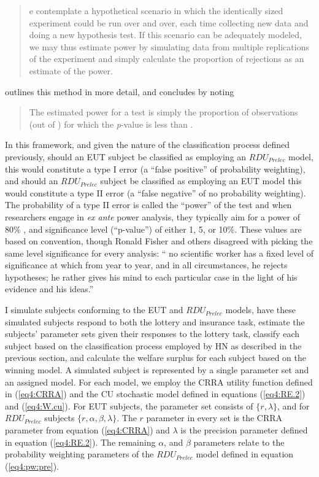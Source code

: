 \documentclass[../main.tex]{subfiles}
\begin{document}
\blockquote{
e contemplate a hypothetical scenario in which the identically sized experiment could be run over and over, each time collecting new data and doing a new hypothesis test. 
If this scenario can be adequately modeled, we may thus estimate power by simulating data from multiple replications of the experiment and simply calculate the proportion of rejections  as an estimate of the power.
}

\textcite[109]{Feiveson2002} outlines this method in more detail, and concludes by noting 
\blockquote{
	The estimated power for a  test is simply the proportion of observations (out of ) for which the \textit{p}-value is less than .
}

In this framework, and given the nature of the classification process defined previously, should an EUT subject be classified as employing an $\mathit{RDU_{Prelec}}$ model, this would constitute a type I error (a \enquote{false positive} of probability weighting), and should an $\mathit{RDU_{Prelec}}$ subject be classified as employing an EUT model this would constitute a type II error (a \enquote{false negative} of no probability weighting).
The probability of a type II error is called the \enquote{power} of the test and when researchers engage in \textit{ex ante} power analysis, they typically aim for a power of 80\% \parencite{Cohen1988, Gelman2014}, and significance level (\enquote{p-value}) of either 1, 5, or 10\%.
These values are based on convention, though Ronald Fisher and others disagreed with picking the same level significance for every analysis: \enquote{\textelp{} no scientific worker has a fixed level of significance at which from year to year, and in all circumstances, he rejects hypotheses; he rather gives his mind to each particular case in the light of his evidence and his ideas.} \parencite{Fisher1956}

I simulate subjects conforming to the EUT and $\mathit{RDU_{Prelec}}$ models, have these simulated subjects respond to both the lottery and insurance task, estimate the subjects' parameter sets given their responses to the lottery task, classify each subject based on the classification process employed by HN as described in the previous section, and calculate the welfare surplus for each subject based on the winning model.{\footnotemark}
A simulated subject is represented by a single parameter set and an assigned model.
For each model, we employ the CRRA utility function defined in (\ref{eq4:CRRA}) and the CU stochastic model defined in equations (\ref{eq4:RE.2}) and (\ref{eq4:W.cu}).
For EUT subjects, the parameter set consists of $\lbrace r, \lambda \rbrace$, and for $\mathit{RDU_{Prelec}}$ subjects $\lbrace r, \alpha, \beta, \lambda \rbrace$.
The $r$ parameter in every set is the CRRA parameter from equation (\ref{eq4:CRRA}) and $\lambda$ is the precision parameter defined in equation (\ref{eq4:RE.2}).
The remaining $\alpha$, and $\beta$ parameters relate to the probability weighting parameters of the $\mathit{RDU_{Prelec}}$ model defined in equation (\ref{eq4:pw:pre}).
\end{document}
